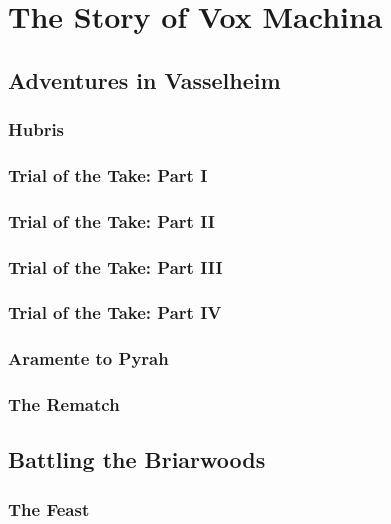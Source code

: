 \section{The Story of Vox Machina} \vspace*{\fill}
    \newpage

    
    
    \newpage
    \subsection{Adventures in Vasselheim} \vspace*{\fill}
    \newpage
        \subsubsection{Hubris}
        \subsubsection{Trial of the Take: Part I}
        \subsubsection{Trial of the Take: Part II}
        \subsubsection{Trial of the Take: Part III}
        \subsubsection{Trial of the Take: Part IV}
        \subsubsection{Aramente to Pyrah}
        \subsubsection{The Rematch}
        
    \newpage
    \subsection{Battling the Briarwoods} \vspace*{\fill}
    \newpage 
        \subsubsection{The Feast}
